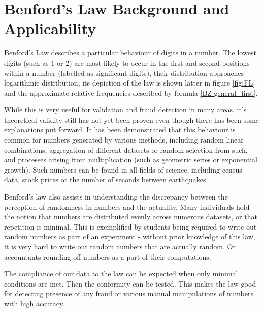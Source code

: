 \chapter{Benford's Law Background and Applicability}

Benford's Law describes a particular behaviour of digits in a number. The lowest digits (such as 1 or 2) are most likely to occur in the first and second positions within a number (labelled as significant digits), their distribution approaches logarithmic distribution, its depiction of the law is shown latter in figure \ref{fig:FL} and the approximate relative frequencies described by formula \ref{BZ-general_first}. \cite{Cerqueti2202,Hronova2023,Newcomb1881}



While this is very useful for validation and fraud detection in many areas, it's theoretical validity still has not yet been proven even though there has been some explanations put forward. %
It has been demonstrated that this behaviour is common for numbers generated by various methods, including random linear combinations, aggregation of different datasets or random selection from such, and processes arising from multiplication (such as geometric series or exponential growth). Such numbers can be found in all fields of science, including census data, stock prices or the number of seconds between earthquakes. \cite{Hronova2023,kossovsky2014benford, Cerqueti2202} %

Benford's law also assists in understanding the discrepancy between the perception of randomness in numbers and the actuality. Many individuals hold the notion that numbers are distributed evenly across numerous datasets, or that repetition is minimal. This is exemplified by students being required to write out random numbers as part of an experiment - without prior knowledge of this law, it is very hard to write out random numbers that are actually random. Or accountants rounding off numbers as a part of their computations. \cite{kossovsky2014benford} %

The compliance of our data to the law can be expected when only minimal conditions are met. Then the conformity can be tested. This makes the law good for detecting presence of any fraud or various manual manipulations of numbers with high accuracy. \cite{kossovsky2014benford, Cerqueti2202,kossovsky2014benford} 

